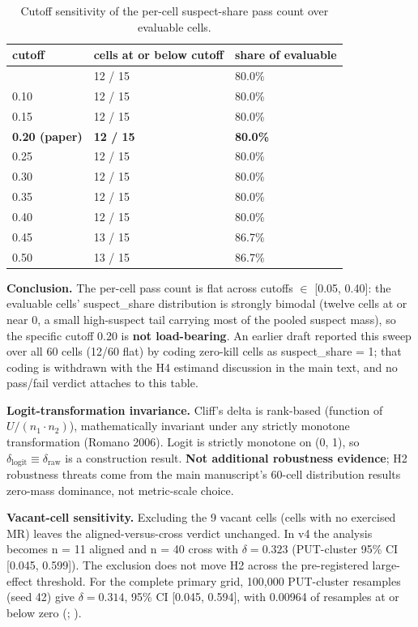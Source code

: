 \documentclass[review,12pt,authoryear]{elsarticle}
\begin{document}
{\def\LTcaptype{table} %
\begin{longtable}[]{@{}lll@{}}
\caption{Cutoff sensitivity of the per-cell suspect-share pass count
over evaluable cells.}\label{tab:p2-22}\\
\toprule\noalign{}
cutoff & cells at or below cutoff & share of evaluable \\
\midrule\noalign{}
\endfirsthead
\endhead
\bottomrule\noalign{}
\endlastfoot
0.05 & 12 / 15 & 80.0\% \\
0.10 & 12 / 15 & 80.0\% \\
0.15 & 12 / 15 & 80.0\% \\
\textbf{0.20 (paper)} & \textbf{12 / 15} & \textbf{80.0\%} \\
0.25 & 12 / 15 & 80.0\% \\
0.30 & 12 / 15 & 80.0\% \\
0.35 & 12 / 15 & 80.0\% \\
0.40 & 12 / 15 & 80.0\% \\
0.45 & 13 / 15 & 86.7\% \\
0.50 & 13 / 15 & 86.7\% \\
\end{longtable}
}

\textbf{Conclusion.} The per-cell pass count is flat across cutoffs
$\in$ {[}0.05, 0.40{]}: the evaluable cells' suspect\_share
distribution is strongly bimodal (twelve cells at or near 0, a small
high-suspect tail carrying most of the pooled suspect mass), so the
specific cutoff 0.20 is \textbf{not load-bearing}. An earlier draft
reported this sweep over all 60 cells (12/60 flat) by coding zero-kill
cells as suspect\_share = 1; that coding is withdrawn with the H4
estimand discussion in the main text, and no pass/fail verdict attaches
to this table.

\textbf{Logit-transformation invariance.} Cliff's delta is rank-based
(function of $U / (n_1 \cdot n_2)$), mathematically invariant under any strictly
monotone transformation (Romano 2006). Logit is strictly monotone on (0,
1), so $\delta_{\mathrm{logit}} \equiv \delta_{\mathrm{raw}}$ is a construction result. \textbf{Not
additional robustness evidence}; H2 robustness threats come from the main manuscript's 60-cell distribution results
zero-mass dominance, not metric-scale choice.

\textbf{Vacant-cell sensitivity.} Excluding the 9 vacant cells (cells
with no exercised MR) leaves the aligned-versus-cross verdict unchanged.
In v4 the analysis becomes n = 11 aligned and n = 40 cross with
$\delta = 0.323$ (PUT-cluster 95\% CI [0.045, 0.599]). The exclusion
does not move H2 across the pre-registered large-effect threshold.
For the complete primary grid, 100,000 PUT-cluster resamples (seed 42)
give \(\delta=0.314\), 95\% CI [0.045, 0.594], with 0.00964 of
resamples at or below zero
(;
).
\end{document}
